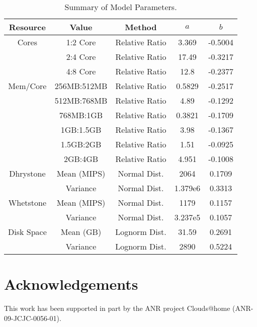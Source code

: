 \documentclass[conference]{IEEEtran}
\begin{document}
\begin{table}
\caption{Summary of Model Parameters.}
\scriptsize
\centering
\begin{tabular}{|c|c|c|c|c|}
\hline
Resource & Value & Method & $a$ & $b$ \\
\hline
Cores & 1:2 Core & Relative Ratio & 3.369 & -0.5004 \\
\hline
& 2:4 Core & Relative Ratio & 17.49 & -0.3217 \\
\hline
& 4:8 Core & Relative Ratio & 12.8 & -0.2377 \\
\hline
Mem/Core & 256MB:512MB & Relative Ratio & 0.5829 & -0.2517 \\
\hline
& 512MB:768MB & Relative Ratio & 4.89 & -0.1292 \\
\hline
& 768MB:1GB & Relative Ratio & 0.3821 & -0.1709 \\
\hline
& 1GB:1.5GB & Relative Ratio & 3.98 & -0.1367 \\
\hline
& 1.5GB:2GB & Relative Ratio & 1.51 & -0.0925 \\
\hline
& 2GB:4GB & Relative Ratio & 4.951 & -0.1008 \\
\hline
Dhrystone & Mean (MIPS) & Normal Dist. & 2064 & 0.1709 \\
\hline
& Variance & Normal Dist. & 1.379e6 & 0.3313 \\
\hline
Whetstone & Mean (MIPS) & Normal Dist. & 1179 & 0.1157 \\
\hline
& Variance & Normal Dist. & 3.237e5 & 0.1057 \\
\hline
Disk Space & Mean (GB) & Lognorm Dist. & 31.59 & 0.2691 \\
\hline
& Variance & Lognorm Dist. & 2890 & 0.5224 \\
\hline
\end{tabular}
\label{model-summary-table}
\end{table}



\section*{Acknowledgements}
\label{Ack}
This work has been supported in part by the ANR project
Clouds@home (ANR-09-JCJC-0056-01).



\end{document}
